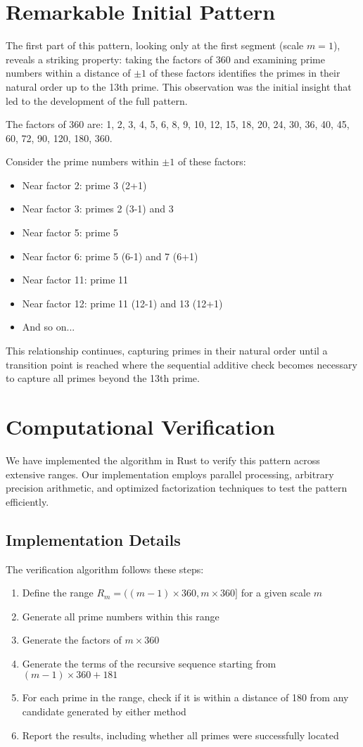 \documentclass[conference]{IEEEtran}
\begin{document}
\section{Remarkable Initial Pattern}
The first part of this pattern, looking only at the first segment (scale $m=1$), reveals a striking property: taking the factors of 360 and examining prime numbers within a distance of $\pm 1$ of these factors identifies the primes in their natural order up to the 13th prime. This observation was the initial insight that led to the development of the full pattern.

The factors of 360 are: 1, 2, 3, 4, 5, 6, 8, 9, 10, 12, 15, 18, 20, 24, 30, 36, 40, 45, 60, 72, 90, 120, 180, 360.

Consider the prime numbers within $\pm 1$ of these factors:
\begin{itemize}
\item Near factor 2: prime 3 (2+1)
\item Near factor 3: primes 2 (3-1) and 3
\item Near factor 5: prime 5
\item Near factor 6: prime 5 (6-1) and 7 (6+1)
\item Near factor 11: prime 11
\item Near factor 12: prime 11 (12-1) and 13 (12+1)
\item And so on...
\end{itemize}

This relationship continues, capturing primes in their natural order until a transition point is reached where the sequential additive check becomes necessary to capture all primes beyond the 13th prime.

\section{Computational Verification}
We have implemented the algorithm in Rust to verify this pattern across extensive ranges. Our implementation employs parallel processing, arbitrary precision arithmetic, and optimized factorization techniques to test the pattern efficiently.

\subsection{Implementation Details}
The verification algorithm follows these steps:
\begin{enumerate}
\item Define the range $R_m = ((m-1) \times 360, m \times 360]$ for a given scale $m$
\item Generate all prime numbers within this range
\item Generate the factors of $m \times 360$
\item Generate the terms of the recursive sequence starting from $(m-1) \times 360 + 181$
\item For each prime in the range, check if it is within a distance of 180 from any candidate generated by either method
\item Report the results, including whether all primes were successfully located
\end{enumerate}
\end{document}
